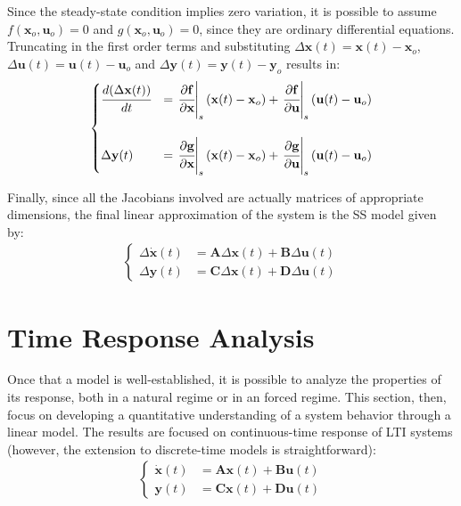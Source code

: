 \documentclass[a4paper,11pt]{book}
\numberwithin{figure}{chapter}
\numberwithin{equation}{chapter}
\numberwithin{table}{chapter}
\theoremstyle{definition}
\begin{document}
Since the steady-state condition implies zero variation, it is possible to assume $f(\mathbf{x}_o, \mathbf{u}_o) = 0$ and $g(\mathbf{x}_o, \mathbf{u}_o) = 0$, since they are ordinary differential equations. Truncating in the first order terms and substituting $\Delta \mathbf{x}(t) = \mathbf{x}(t) - \mathbf{x}_o$, $\Delta \mathbf{u}(t) = \mathbf{u}(t) - \mathbf{u}_o$ and $\Delta \mathbf{y}(t) = \mathbf{y}(t) - \mathbf{y}_o$ results in:
\begin{align}
\begin{cases}
	\cfrac{d(\Delta \mathbf{x}(t))}{dt} &=\left. \cfrac{\partial \mathbf{f}}{\partial \mathbf{x}}\right\vert_{s} (\mathbf{x}(t) - \mathbf{x}_o) + \left. \cfrac{\partial \mathbf{f}}{\partial \mathbf{u}}\right\vert_{s}  (\mathbf{u}(t) - \mathbf{u}_o) \\ \\
	\Delta \mathbf{y}(t) &= \left. \cfrac{\partial \mathbf{g}}{\partial \mathbf{x}}\right\vert_{s} (\mathbf{x}(t) - \mathbf{x}_o) + \left. \cfrac{\partial \mathbf{g}}{\partial \mathbf{u}}\right\vert_{s}  (\mathbf{u}(t) - \mathbf{u}_o) \\
\end{cases}
\end{align}

Finally, since all the Jacobians involved are actually matrices of appropriate dimensions, the final linear approximation of the system is the SS model given by:
\begin{align}
\begin{cases}
	\Delta \mathbf{\dot{x}}(t) &= \mathbf{A}\Delta \mathbf{x}(t) + \mathbf{B}\Delta \mathbf{u}(t) \\
	\Delta \mathbf{y}(t) &= \mathbf{C}\Delta \mathbf{x}(t) + \mathbf{D}\Delta \mathbf{u}(t)
\end{cases}
\end{align}

\section{Time Response Analysis}

Once that a model is well-established, it is possible to analyze the properties of its response, both in a natural regime or in an forced regime. This section, then, focus on developing a quantitative understanding of a system behavior through a linear model. The results are focused on continuous-time response of LTI systems (however, the extension to discrete-time models is straightforward):
\begin{align}
\begin{cases}
	\mathbf{\dot{x}}(t) &= \mathbf{A} \mathbf{x}(t) + \mathbf{B} \mathbf{u}(t) \\
	\mathbf{y}(t) &= \mathbf{C} \mathbf{x}(t) + \mathbf{D} \mathbf{u}(t)
\end{cases}
\end{align}
\end{document}

